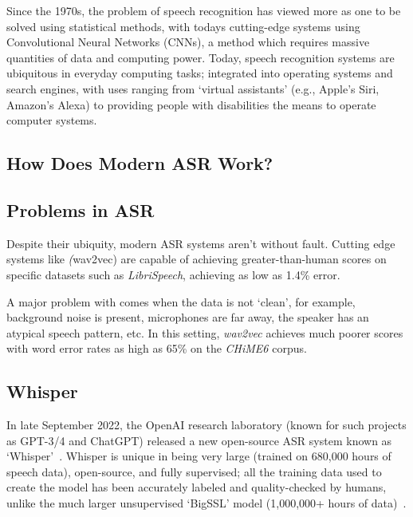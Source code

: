 Since the 1970s, the problem of speech recognition has viewed more as one to be solved using statistical methods\cite{early-asr,Rabiner2004Jan,LevinsonS.E.1983Aitt}, with todays cutting-edge systems using Convolutional Neural Networks (CNNs)\cite{whisper,wav2vec2,bigssl,chung2021}, a method which requires massive quantities of data and computing power.
Today, speech recognition systems are ubiquitous in everyday computing tasks; 
integrated into operating systems and search engines, with uses ranging from `virtual assistants' (e.g., Apple's Siri, Amazon's Alexa) to providing people with disabilities the means to operate computer systems.

\subsection{How Does Modern ASR Work?}

\subsection{Problems in ASR}

Despite their ubiquity, modern ASR systems aren't without fault.
Cutting edge systems like \emph(wav2vec) are capable of achieving greater-than-human scores on specific datasets\cite{wav2vec2,bigssl,chung2021} such as \emph{LibriSpeech}\cite{librispeech}, achieving as low as 1.4\% error\cite{zhang2020}.

A major problem with comes when the data is not `clean', for example, background noise is present, microphones are far away, the speaker has an atypical speech pattern, etc. 
In this setting, \emph{wav2vec} achieves much poorer scores with word error rates as high as 65\%\cite{whisper} on the \emph{CHiME6} corpus\cite{chime6}.

\subsection{Whisper}

In late September 2022, the OpenAI research laboratory (known for such projects as GPT-3/4 and ChatGPT) released a new open-source ASR system known as `Whisper'~\cite{whisper}.
Whisper is unique in being very large (trained on 680,000 hours of speech data), open-source, and fully supervised;
all the training data used to create the model has been accurately labeled and
quality-checked by humans, unlike the much larger unsupervised `BigSSL' model (1,000,000+ hours of data)~\cite{bigssl}.

